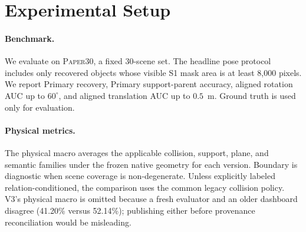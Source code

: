 \documentclass[10pt,twocolumn]{article}
\newcommand{\paperthirty}{\textsc{Paper30}}
\begin{document}
\section{Experimental Setup}

\paragraph{Benchmark.}
We evaluate on \paperthirty{}, a fixed 30-scene set.  The headline pose
protocol includes only recovered objects whose visible S1 mask area is at
least 8,000 pixels.  We report Primary recovery, Primary support-parent
accuracy, aligned rotation AUC up to $60^\circ$, and aligned translation AUC
up to $0.5$~m.  Ground truth is used only for evaluation.

\paragraph{Physical metrics.}
The physical macro averages the applicable collision, support, plane, and
semantic families under the frozen native geometry for each version.  Boundary
is diagnostic when scene coverage is non-degenerate.  Unless explicitly
labeled relation-conditioned, the comparison uses the common legacy collision
policy.  V3's physical macro is omitted because a fresh evaluator and an older
dashboard disagree (41.20\% versus 52.14\%); publishing either before
provenance reconciliation would be misleading.
\end{document}
